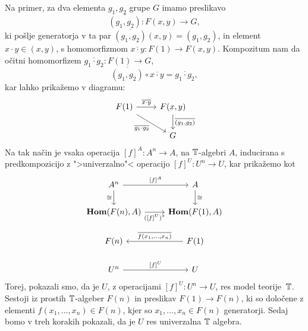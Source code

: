 \documentclass[../kategoricna_logika.tex]{subfiles}
\begin{document}
\begin{dokaz}
  Na primer, za dva elementa $g_1, g_2$ grupe $G$ imamo preslikavo
  \[\overline{(g_1, g_2)} : F(x,y) \to G, \]
  ki pošlje generatorja v ta par
  $\overline{(g_1, g_2)}(x,y) = (g_1, g_2)$, in element ${x \cdot y \in (x,y)}$,
  s homomorfizmom
  $\overline{x \cdot y}: F(1) \to F(x,y)$. Kompozitum nam da očitni homomorfizem
  $\overline{g_1 \cdot g_2} : F(1) \to G$,
  \[ \overline{(g_1, g_2)} \circ \overline{x \cdot y} = \overline{g_1 \cdot g_2}, \]
  kar lahko prikažemo v diagramu:
  \begin{equation*}
    \begin{tikzcd}
      F(1) \ar[dr, "{\overline{g_1 \cdot g_2}}"'] \ar[r, "{\overline{x \cdot y}}"] &
      F(x,y) \ar[d, "\overline{(g_1,g_2)}"] \\
      & G      
    \end{tikzcd}
  \end{equation*}
  Na tak način je vsaka operacija $[f]^A : A^n \to A$, na $\mathbb{T}$-algebri $A$, inducirana s
  predkompozicijo z ">univerzalno"< operacijo $[f]^U : U^n \to U$, kar prikažemo kot
  \begin{equation}\label{diag:univerzalna-operacija}
    \begin{tikzcd}
      A^n \ar[d, "\cong"'] \ar[r, "{[f]^{A}}"] & A \ar[d, "\cong"] \\
      \Hom(F(n), A) \ar[r, "{([f]^U)^{*}}"'] & \Hom(F(1), A) \\
      F(n) & F(1) \ar[l, "{\overline{f(x_1, \ldots, x_n)}}"'] \\
      U^n \ar[r, "{[f]^U}"] & U
    \end{tikzcd}
  \end{equation}
  Torej, pokazali smo, da je $U$, z operacijami $[f]^U : U^n \to U$, res
  model teorije~$\mathbb{T}$. Sestoji iz prostih $\mathbb{T}$-algeber $F(n)$ in
  preslikav $F(1) \to F(n)$, ki so določene z elementi $f(x_1, \ldots, x_n) \in F(n)$,
  kjer so $x_1, \ldots , x_n \in F(n)$ generatorji. Sedaj bomo v treh korakih pokazali,
  da je $U$ res univerzalna $\mathbb{T}$ algebra.


\end{dokaz}
\end{document}
